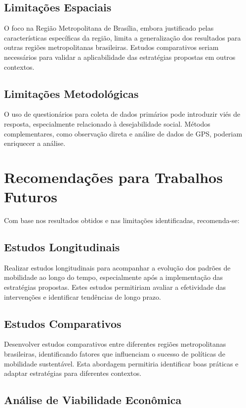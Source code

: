 \subsection{Limitações Espaciais}

O foco na Região Metropolitana de Brasília, embora justificado pelas características específicas da região, limita a generalização dos resultados para outras regiões metropolitanas brasileiras. Estudos comparativos seriam necessários para validar a aplicabilidade das estratégias propostas em outros contextos.

\subsection{Limitações Metodológicas}

O uso de questionários para coleta de dados primários pode introduzir viés de resposta, especialmente relacionado à desejabilidade social. Métodos complementares, como observação direta e análise de dados de GPS, poderiam enriquecer a análise.

\section{Recomendações para Trabalhos Futuros}

Com base nos resultados obtidos e nas limitações identificadas, recomenda-se:

\subsection{Estudos Longitudinais}

Realizar estudos longitudinais para acompanhar a evolução dos padrões de mobilidade ao longo do tempo, especialmente após a implementação das estratégias propostas. Estes estudos permitiriam avaliar a efetividade das intervenções e identificar tendências de longo prazo.

\subsection{Estudos Comparativos}

Desenvolver estudos comparativos entre diferentes regiões metropolitanas brasileiras, identificando fatores que influenciam o sucesso de políticas de mobilidade sustentável. Esta abordagem permitiria identificar boas práticas e adaptar estratégias para diferentes contextos.

\subsection{Análise de Viabilidade Econômica}

